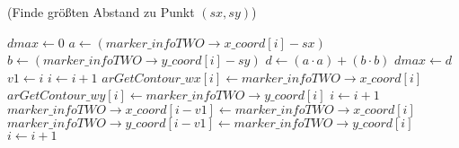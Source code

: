 \begin{algorithm}[ht]
\caption{ (Finde größten Abstand zu Punkt $(sx,sy)$)}
\label{alg:argetcontour-3}
\begin{algorithmic}[1]
	\State $\mathit{dmax} \gets 0$
	\label{alg:argetcontour-3-initdmax}
	\label{alg:argetcontour-3-finddmax-start}
		\State $a \gets (\mathit{marker\_infoTWO \to x\_coord}\left[i\right] - sx)$
		\label{alg:argetcontour-3-calcdistance-start}
		\State $b \gets (\mathit{marker\_infoTWO \to y\_coord}\left[i\right] - sy)$
		\State $d \gets (a \cdot a) + (b \cdot b)$
		\label{alg:argetcontour-3-calcdistance-end}
		\label{alg:argetcontour-3-isdmaxbigger}
			\State $\mathit{dmax} \gets d$
			\label{alg:argetcontour-3-savedmax}
			\State $\mathit{v1} \gets i$
		\EndIf
		\State $i \gets i + 1$
	\EndFor
	\label{alg:argetcontour-3-finddmax-end}
	\label{alg:argetcontour-3-dividev1-start}
		\State $\mathit{arGetContour\_wx}[i] \gets \mathit{marker\_infoTWO \to x\_coord}\left[i\right]$
		\State $\mathit{arGetContour\_wy}[i] \gets \mathit{marker\_infoTWO \to y\_coord}\left[i\right]$
		\State $i \gets i + 1$
	\EndFor
	\label{alg:argetcontour-3-dividev1-end}
	\label{alg:argetcontour-3-dividecoordnum-start}
		\State $\mathit{marker\_infoTWO \to x\_coord}\left[i - \mathit{v1}\right] \gets \mathit{marker\_infoTWO \to x\_coord}\left[i\right]$
		\State $\mathit{marker\_infoTWO \to y\_coord}\left[i - \mathit{v1}\right] \gets \mathit{marker\_infoTWO \to y\_coord}\left[i\right]$
		\State $i \gets i + 1$
	\EndFor
	\label{alg:argetcontour-3-dividecoordnum-end}
	\label{alg:argetcontour-3-merge-start}

\end{algorithmic}
\end{algorithm}
